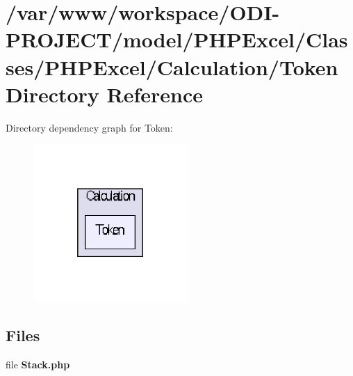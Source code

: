 \section{/var/www/workspace/\+O\+D\+I-\/\+P\+R\+O\+J\+E\+C\+T/model/\+P\+H\+P\+Excel/\+Classes/\+P\+H\+P\+Excel/\+Calculation/\+Token Directory Reference}
\label{dir_c892973c83499a67ab3ad68f558edeb0}
Directory dependency graph for Token\+:\nopagebreak
\begin{figure}[H]
\begin{center}
\leavevmode
\includegraphics[width=166pt]{dir_c892973c83499a67ab3ad68f558edeb0_dep}
\end{center}
\end{figure}
\subsection*{Files}
\begin{DoxyCompactItemize}
\item 
file {\bfseries Stack.\+php}
\end{DoxyCompactItemize}
